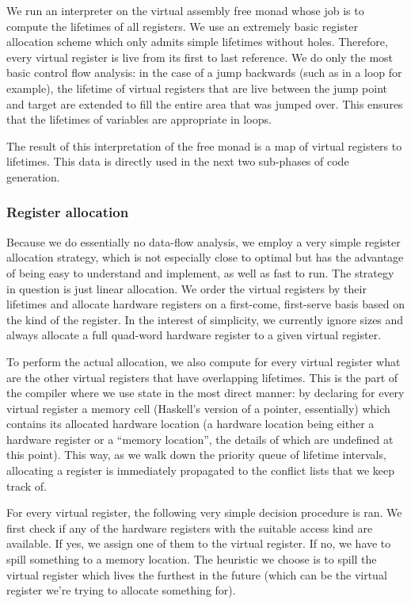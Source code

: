 \documentclass[letterpaper,11pt]{article}
\begin{document}
We run an interpreter on the virtual assembly free monad whose job is to compute the lifetimes of all registers. We use an extremely basic register allocation scheme which only admits simple lifetimes without holes. Therefore, every virtual register is live from its first to last reference. We do only the most basic control flow analysis: in the case of a jump backwards (such as in a loop for example), the lifetime of virtual registers that are live between the jump point and target are extended to fill the entire area that was jumped over. This ensures that the lifetimes of variables are appropriate in loops.

The result of this interpretation of the free monad is a map of virtual registers to lifetimes. This data is directly used in the next two sub-phases of code generation.

\subsubsection{Register allocation}

Because we do essentially no data-flow analysis, we employ a very simple register allocation strategy, which is not especially close to optimal but has the advantage of being easy to understand and implement, as well as fast to run. The strategy in question is just linear allocation. We order the virtual registers by their lifetimes and allocate hardware registers on a first-come, first-serve basis based on the kind of the register. In the interest of simplicity, we currently ignore sizes and always allocate a full quad-word hardware register to a given virtual register.

To perform the actual allocation, we also compute for every virtual register what are the other virtual registers that have overlapping lifetimes. This is the part of the compiler where we use state in the most direct manner: by declaring for every virtual register a memory cell (Haskell's version of a pointer, essentially) which contains its allocated hardware location (a hardware location being either a hardware register or a ``memory location'', the details of which are undefined at this point). This way, as we walk down the priority queue of lifetime intervals, allocating a register is immediately propagated to the conflict lists that we keep track of.

For every virtual register, the following very simple decision procedure is ran. We first check if any of the hardware registers with the suitable access kind are available. If yes, we assign one of them to the virtual register. If no, we have to spill something to a memory location. The heuristic we choose is to spill the virtual register which lives the furthest in the future (which can be the virtual register we're trying to allocate something for).
\end{document}
